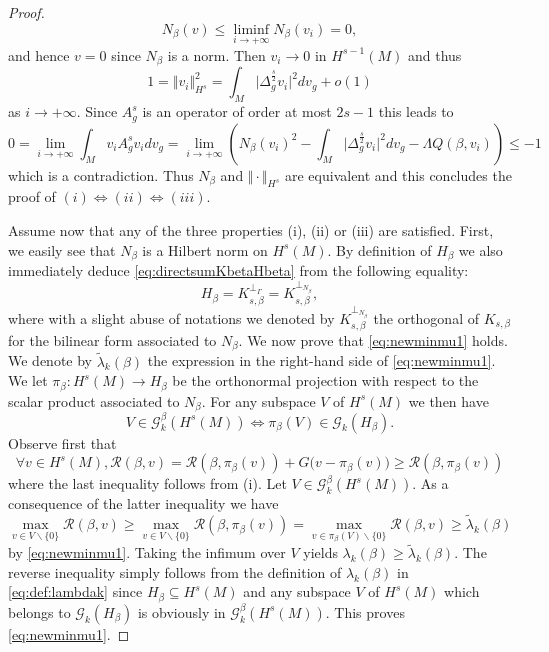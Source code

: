 \documentclass[10pt]{amsart}
\numberwithin{equation}{section}
\theoremstyle{plain}
\theoremstyle{remark}
\begin{document}
\begin{proof}
$$ N_\beta(v) \leq \liminf_{i\to+\infty} N_\beta(v_i) = 0 ,$$
and hence $v = 0$ since $N_\beta$ is a norm. Then $v_i \to 0$ in $H^{s-1}(M)$ and thus %
$$ 1 = \Vert v_i \Vert_{H^s}^2 =  \int_M \big|\Delta_g^{\frac{s}{2}} v_i \big|^2 dv_g + o(1) $$
as $i\to +\infty$. Since $A_g^s$ is an operator of order at most $2s-1$ this leads to
$$ 0 = \lim_{i\to+\infty} \int_M v_i A_g^s v_i dv_g = \lim_{i\to+\infty} \left( N_\beta(v_i)^2 - \int_M \big|\Delta_g^{\frac{s}{2}} v_i \big|^2 dv_g - \Lambda Q(\beta,v_i) \right) \le -1 $$
which is a contradiction. %
Thus $N_\beta$ and $\Vert \cdot \Vert_{H^s}$ are equivalent and this concludes the proof of $(i)\Leftrightarrow(ii)\Leftrightarrow(iii)$.


\medskip

Assume now that any of the three properties (i), (ii) or (iii) are satisfied. First, we easily see that $N_\beta$ is a Hilbert norm on $H^s(M)$. By definition of $H_\beta$ we also immediately deduce \eqref{eq:directsumKbetaHbeta} from the following equality:
$$ H_\beta = K_{s,\beta}^{\perp_\Gamma} = K_{s,\beta}^{\perp_{N_\beta}}, $$
where with a slight abuse of notations we denoted by $K_{s,\beta}^{\perp_{N_\beta}}$ the orthogonal of $K_{s,\beta}$ for the bilinear form associated to $N_\beta$. We now prove that \eqref{eq:newminmu1} holds. We denote by $\tilde{\lambda}_k(\beta)$ the expression in the right-hand side of \eqref{eq:newminmu1}. We let $\pi_\beta : H^s(M) \to H_\beta$ be the orthonormal projection with respect to the scalar product associated to $N_\beta$. For any subspace $V$ of $H^s(M)$ we then have
$$ V\in \mathcal{G}_k^\beta(H^s(M)) \Leftrightarrow  \pi_\beta(V) \in \mathcal{G}_k(H_\beta). $$
Observe first that 
$$ \forall v \in H^s(M) , \mathcal{R}(\beta,v) = \mathcal{R}(\beta,\pi_\beta(v)) + G \big( v - \pi_\beta(v) \big) \ge  \mathcal{R}(\beta,\pi_\beta(v)) $$
where the last inequality follows from (i). Let $V \in \mathcal{G}_k^\beta(H^s(M))$. As a consequence of the latter inequality we have
$$ \max_{v \in V \backslash \{0\}}  \mathcal{R}(\beta,v) \ge \max_{v \in V \backslash \{0\}} \mathcal{R}(\beta,\pi_\beta(v)) = \max_{v \in \pi_{\beta}(V) \backslash \{0\}} \mathcal{R}(\beta,v) \ge \tilde{\lambda}_k(\beta) $$
by  \eqref{eq:newminmu1}. Taking the infimum over $V$ yields $\lambda_k(\beta) \ge \tilde{\lambda}_k(\beta)$. The reverse inequality simply follows from the definition of $\lambda_k(\beta)$ in \eqref{eq:def:lambdak} since $H_\beta \subseteq H^s(M)$ and any subspace $V$ of $H^s(M)$ which belongs to $\mathcal{G}_k(H_\beta)$ is obviously in $\mathcal{G}_k^\beta(H^s(M))$. This proves \eqref{eq:newminmu1}.


\end{proof}
\end{document}
